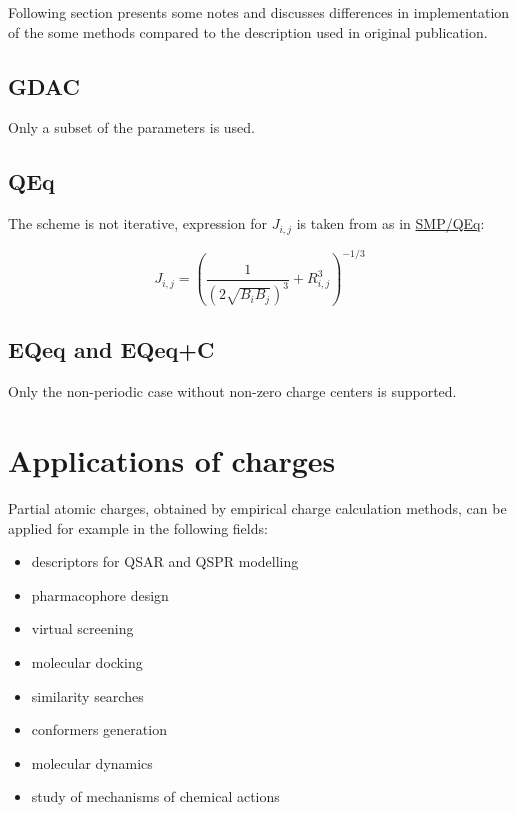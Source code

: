 \documentclass[oneside]{memoir}
\newcommand\ddfrac[2]{\frac{\displaystyle #1}{\displaystyle #2}}
\begin{document}
Following section presents some notes and discusses differences in implementation of the some methods compared to the description used in original publication.

\section*{GDAC}
Only a subset of the parameters is used.

\section*{QEq}
The scheme is not iterative, expression for $J_{i,j}$ is taken from \cite{Louwen1998} as in \hyperref[sec:methods_smpqeq]{SMP/QEq}:

\begin{equation}
\label{eq:qeq_louwen}
J_{i, j} = \left(\ddfrac{1}{(2\sqrt{B_iB_j})^3} + R_{i,j}^3\right)^{-1/3}
\end{equation}

\section*{EQeq and EQeq+C}
Only the non-periodic case without non-zero charge centers is supported.

\chapter*{Applications of charges}

Partial atomic charges, obtained by empirical charge calculation methods, can be applied for example in the following fields:

\begin{itemize}
\item descriptors for QSAR and QSPR modelling \cite{Svobodova2011, Varekova2013, Geidl2015, Dixon1993, Zhang2006, Gross2002, Ghafourian2000, Dudek2006, Karelson1996}
\item pharmacophore design \cite{Todeschini2008, Galvez1994, Stalke2011}
\item virtual screening \cite{Mannhold2006, Macdougall2007, Clement2000}
\item molecular docking \cite{Park2006, Nebgen2018, Rimac2017}
\item similarity searches \cite{Kearsley1996, Nikolova2003, Holliday2003}
\item conformers generation \cite{Vainio2007}
\item molecular dynamics \cite{Rappe1991, Chenoweth2008, Nejad2018, Lee2018}
\item study of mechanisms of chemical actions \cite{Ionescu2012, Rimac2017, Wheeler2019}
\end{itemize}

\printbibliography
\end{document}
